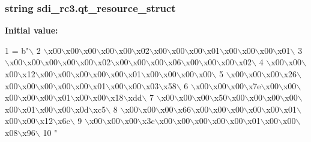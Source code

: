 \subsubsection[{qt\+\_\+resource\+\_\+struct}]{\setlength{\rightskip}{0pt plus 5cm}string sdi\+\_\+rc3.\+qt\+\_\+resource\+\_\+struct}\label{namespacesdi__rc3_ab83b96fc0fa23f644226a3a14eda90eb}
{\bfseries Initial value\+:}
\begin{DoxyCode}
1 = b\textcolor{stringliteral}{"\(\backslash\)}
2 \textcolor{stringliteral}{\(\backslash\)x00\(\backslash\)x00\(\backslash\)x00\(\backslash\)x00\(\backslash\)x00\(\backslash\)x02\(\backslash\)x00\(\backslash\)x00\(\backslash\)x00\(\backslash\)x01\(\backslash\)x00\(\backslash\)x00\(\backslash\)x00\(\backslash\)x01\(\backslash\)}
3 \textcolor{stringliteral}{\(\backslash\)x00\(\backslash\)x00\(\backslash\)x00\(\backslash\)x00\(\backslash\)x00\(\backslash\)x02\(\backslash\)x00\(\backslash\)x00\(\backslash\)x00\(\backslash\)x06\(\backslash\)x00\(\backslash\)x00\(\backslash\)x00\(\backslash\)x02\(\backslash\)}
4 \textcolor{stringliteral}{\(\backslash\)x00\(\backslash\)x00\(\backslash\)x00\(\backslash\)x12\(\backslash\)x00\(\backslash\)x00\(\backslash\)x00\(\backslash\)x00\(\backslash\)x00\(\backslash\)x01\(\backslash\)x00\(\backslash\)x00\(\backslash\)x00\(\backslash\)x00\(\backslash\)}
5 \textcolor{stringliteral}{\(\backslash\)x00\(\backslash\)x00\(\backslash\)x00\(\backslash\)x26\(\backslash\)x00\(\backslash\)x00\(\backslash\)x00\(\backslash\)x00\(\backslash\)x00\(\backslash\)x01\(\backslash\)x00\(\backslash\)x00\(\backslash\)x03\(\backslash\)x58\(\backslash\)}
6 \textcolor{stringliteral}{\(\backslash\)x00\(\backslash\)x00\(\backslash\)x00\(\backslash\)x7e\(\backslash\)x00\(\backslash\)x00\(\backslash\)x00\(\backslash\)x00\(\backslash\)x00\(\backslash\)x01\(\backslash\)x00\(\backslash\)x00\(\backslash\)x18\(\backslash\)xdd\(\backslash\)}
7 \textcolor{stringliteral}{\(\backslash\)x00\(\backslash\)x00\(\backslash\)x00\(\backslash\)x50\(\backslash\)x00\(\backslash\)x00\(\backslash\)x00\(\backslash\)x00\(\backslash\)x00\(\backslash\)x01\(\backslash\)x00\(\backslash\)x00\(\backslash\)x0d\(\backslash\)xc5\(\backslash\)}
8 \textcolor{stringliteral}{\(\backslash\)x00\(\backslash\)x00\(\backslash\)x00\(\backslash\)x66\(\backslash\)x00\(\backslash\)x00\(\backslash\)x00\(\backslash\)x00\(\backslash\)x00\(\backslash\)x01\(\backslash\)x00\(\backslash\)x00\(\backslash\)x12\(\backslash\)x6c\(\backslash\)}
9 \textcolor{stringliteral}{\(\backslash\)x00\(\backslash\)x00\(\backslash\)x00\(\backslash\)x3c\(\backslash\)x00\(\backslash\)x00\(\backslash\)x00\(\backslash\)x00\(\backslash\)x00\(\backslash\)x01\(\backslash\)x00\(\backslash\)x00\(\backslash\)x08\(\backslash\)x96\(\backslash\)}
10 \textcolor{stringliteral}{"}
\end{DoxyCode}
